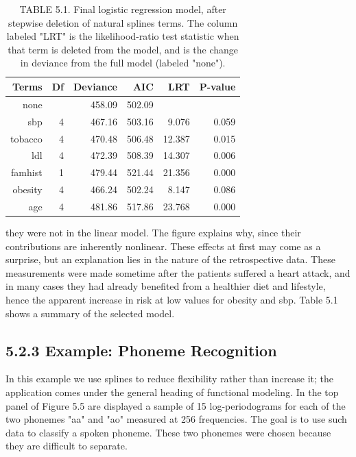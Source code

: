 \documentclass[10pt]{article}
\begin{document}
\begin{table}[h]
\begin{center}
\captionsetup{labelformat=empty}
\caption{TABLE 5.1. Final logistic regression model, after stepwise deletion of natural splines terms. The column labeled "LRT" is the likelihood-ratio test statistic when that term is deleted from the model, and is the change in deviance from the full model (labeled "none").}
\begin{tabular}{rrrrrr}
\hline
Terms & Df & Deviance & AIC & LRT & P-value \\
\hline
none &  & 458.09 & 502.09 &  &  \\
sbp & 4 & 467.16 & 503.16 & 9.076 & 0.059 \\
tobacco & 4 & 470.48 & 506.48 & 12.387 & 0.015 \\
ldl & 4 & 472.39 & 508.39 & 14.307 & 0.006 \\
famhist & 1 & 479.44 & 521.44 & 21.356 & 0.000 \\
obesity & 4 & 466.24 & 502.24 & 8.147 & 0.086 \\
age & 4 & 481.86 & 517.86 & 23.768 & 0.000 \\
\hline
\end{tabular}
\end{center}
\end{table}

they were not in the linear model. The figure explains why, since their contributions are inherently nonlinear. These effects at first may come as a surprise, but an explanation lies in the nature of the retrospective data. These measurements were made sometime after the patients suffered a heart attack, and in many cases they had already benefited from a healthier diet and lifestyle, hence the apparent increase in risk at low values for obesity and sbp. Table 5.1 shows a summary of the selected model.

\subsection*{5.2.3 Example: Phoneme Recognition}
In this example we use splines to reduce flexibility rather than increase it; the application comes under the general heading of functional modeling. In the top panel of Figure 5.5 are displayed a sample of 15 log-periodograms for each of the two phonemes "aa" and "ao" measured at 256 frequencies. The goal is to use such data to classify a spoken phoneme. These two phonemes were chosen because they are difficult to separate.
\end{document}
